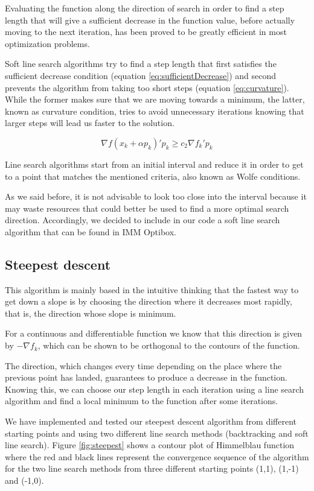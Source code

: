 Evaluating the function along the direction of search in order to find a step length that will give a sufficient decrease in the function value, before actually moving to the next iteration, has been proved to be greatly efficient in most optimization problems.

Soft line search algorithms try to find a step length that first satisfies the sufficient decrease condition (equation \ref{eq:sufficientDecrease}) and second prevents the algorithm from taking too short steps (equation \ref{eq:curvature}). While the former makes sure that we are moving towards a minimum, the latter, known as curvature condition, tries to avoid unnecessary iterations knowing that larger steps will lead us faster to the solution.


\begin{equation}
\nabla f(x_k + \alpha p_k)' p_k  \geq c_2 \nabla f_k' p_k
\label{eq:curvature}
\end{equation}

Line search algorithms start from an initial interval and reduce it in order to get to a point that matches the mentioned criteria, also known as Wolfe conditions.
 
As we said before, it is not advisable to look too close into the interval because it may waste resources that could better be used to find a more optimal search direction. Accordingly, we decided to include in our code a soft line search algorithm  that can be found in IMM Optibox.


\subsection{Steepest descent}

This algorithm is mainly based in the intuitive thinking that the fastest way to get down a slope is by choosing the direction where it decreases most rapidly, that is, the direction whose slope is minimum. 

For a continuous and differentiable function we know that this direction is given by $-\nabla f_k$, which can be shown to be orthogonal to the contours of the function. 

The direction, which changes every time depending on the place where the previous point has landed, guarantees to produce a decrease in the function. Knowing this, we can choose our step length in each iteration using a line search algorithm and find a local minimum to the function after some iterations.

We have implemented and tested our steepest descent algorithm from different starting points and using two different line search methods (backtracking and soft line search). Figure \ref{fig:steepest} shows a contour plot of Himmelblau function where the red and black lines represent the convergence sequence of the algorithm for the two line search methods from three different starting points (1,1), (1,-1) and (-1,0).

